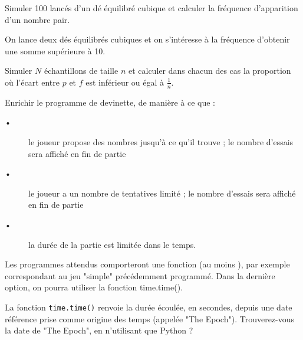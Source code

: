 \begin{ExD}

Simuler 100 lancés d'un dé équilibré cubique et calculer la fréquence d'apparition d'un nombre pair. 
\end{ExD}


 


\begin{ExD}

On lance deux dés équilibrés cubiques et on s'intéresse à la fréquence d'obtenir une somme supérieure à 10. 

Simuler $N$ échantillons de taille $n$ et calculer dans chacun des cas la proportion où l'écart entre $p$ et $f$ est inférieur ou égal à $\frac{1}{n}$.    
\end{ExD}


\begin{ExD}

Enrichir le programme de devinette, de manière à ce que :
\begin{description}
\item[•] le joueur propose des nombres jusqu’à ce qu’il trouve ; le nombre d’essais sera affiché en fin de partie
\item[•] le joueur a un nombre de tentatives limité ; le nombre d’essais sera affiché en fin de partie
\item[•] la durée de la partie est limitée dans le temps.
\end{description}

Les programmes attendus comporteront une fonction (au moins ), par exemple correspondant au jeu "simple" précédemment
programmé. Dans la dernière option, on pourra utiliser la fonction time.time().
\end{ExD}

\begin{Rq}
La fonction \texttt{time.time()} renvoie la durée écoulée, en secondes, depuis une date référence prise comme origine des
temps (appelée "The Epoch"). Trouverez-vous la date de "The Epoch", en n’utilisant que Python ?
\end{Rq}

\newpage



